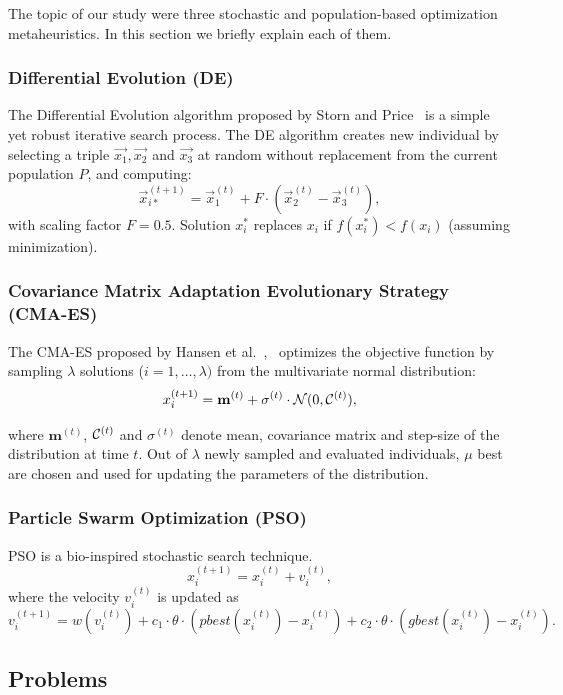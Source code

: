 \documentclass{sig-alternate}
\begin{document}
The topic of our study were three stochastic and population-based optimization metaheuristics.
In this section we briefly explain each of them.%

\subsubsection{Differential Evolution (DE)}
The Differential Evolution algorithm proposed by Storn and Price~\cite{storn1997differential} is a simple yet robust iterative search process.
The DE algorithm creates new individual by selecting a triple $\vec{x_1}, \vec{x_2}$ and $\vec{x_3}$ at random without replacement from the current population $P$, and computing:
$$\vec{x}_{i*}^{(t+1)} = \vec{x}_1^{(t)} + F \cdot (\vec{x}_2^{(t)} - \vec{x}_3^{(t)}),$$
with scaling factor $F=0.5$.
Solution $x_i^*$ replaces $x_i$ if $f(x_i^*) < f(x_i)$ (assuming minimization).

\subsubsection{Covariance Matrix Adaptation Evolutionary Strategy (CMA-ES)}

The CMA-ES proposed by Hansen et al.~\cite{hansen2001completely},~\cite{hansen2003reducing} optimizes the objective function by sampling $\lambda$ solutions ($i = 1,\ldots,\lambda)$ from the multivariate normal distribution:
$$x_i^{(t + 1)} = \textbf{m}^{(t)} + \sigma^{(t)} \cdot {\cal N}(0, {\cal C}^{(t)}),$$

where $\textbf{m}^{(t)}$, ${\cal C}^{(t)}$ and $\sigma^{(t)}$ denote mean, covariance matrix and step-size of the distribution at time $t$.
Out of $\lambda$ newly sampled and evaluated individuals, $\mu$ best are chosen and used for updating the parameters of the distribution.

\subsubsection{Particle Swarm Optimization (PSO)}

PSO is a bio-inspired stochastic search technique.
$$
    x_i^{(t+1)} = x_i^{(t)} + v_i^{(t)},
$$
where the velocity $v_i^{(t)}$ is updated as
$$
v_i^{(t+1)} = w(v_i^{(t)}) + c_1 \cdot \theta\cdot(pbest(x_i^{(t)}) - x_i^{(t)}) + c_2 \cdot \theta\cdot(gbest(x_i^{(t)}) - x_i^{(t)}).
$$

\subsection{Problems}
\end{document}
